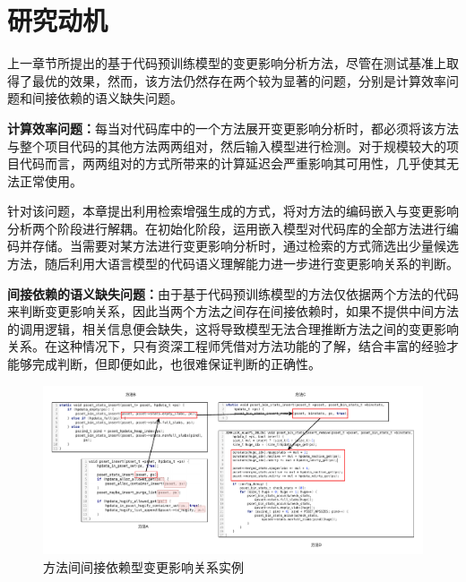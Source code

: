 \section{研究动机}

上一章节所提出的基于代码预训练模型的变更影响分析方法，尽管在测试基准上取得了最优的效果，然而，该方法仍然存在两个较为显著的问题，分别是计算效率问题和间接依赖的语义缺失问题。

\textbf{计算效率问题：}每当对代码库中的一个方法展开变更影响分析时，都必须将该方法与整个项目代码的其他方法两两组对，然后输入模型进行检测。对于规模较大的项目代码而言，两两组对的方式所带来的计算延迟会严重影响其可用性，几乎使其无法正常使用。

针对该问题，本章提出利用检索增强生成的方式，将对方法的编码嵌入与变更影响分析两个阶段进行解耦。在初始化阶段，运用嵌入模型对代码库的全部方法进行编码并存储。当需要对某方法进行变更影响分析时，通过检索的方式筛选出少量候选方法，随后利用大语言模型的代码语义理解能力进一步进行变更影响关系的判断。

\textbf{间接依赖的语义缺失问题：}由于基于代码预训练模型的方法仅依据两个方法的代码来判断变更影响关系，因此当两个方法之间存在间接依赖时，如果不提供中间方法的调用逻辑，相关信息便会缺失，这将导致模型无法合理推断方法之间的变更影响关系。在这种情况下，只有资深工程师凭借对方法功能的了解，结合丰富的经验才能够完成判断，但即便如此，也很难保证判断的正确性。

\begin{figure}[htbp]
\centering
\includegraphics[width = 1\textwidth]{figures/3_间接依赖例子.pdf}
\caption{方法间间接依赖型变更影响关系实例}
\label{3_间接依赖例子}
\end{figure}

